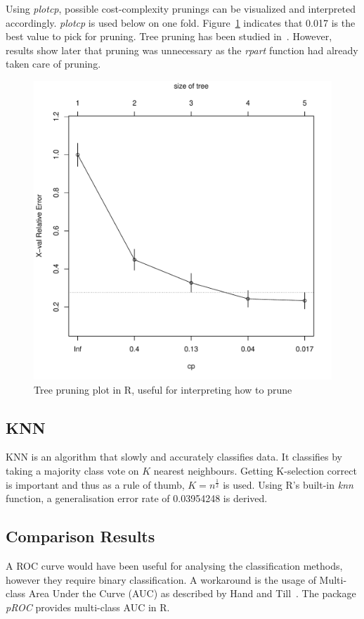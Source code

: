 \documentclass[11pt]{article}
\begin{document}
\pagebreak Using \textit{plotcp}, possible cost-complexity prunings can be visualized and interpreted accordingly. \textit{plotcp} is used below on one fold. Figure~\ref{fig:t2_tree_prune} indicates that 0.017 is the best value to pick for pruning. Tree pruning has been studied in~\cite{cestnik1991estimating}. However, results show later that pruning was unnecessary as the \textit{rpart} function had already taken care of pruning.
\begin{figure}[H]
    \centering
    \includegraphics[width=1.0\textwidth]{t2_tree_prune}
    \caption{Tree pruning plot in R, useful for interpreting how to prune}
    \label{fig:t2_tree_prune}
\end{figure}

\pagebreak\subsection{KNN}
KNN is an algorithm that slowly and accurately classifies data. It classifies by taking a majority class vote on $K$ nearest neighbours. Getting K-selection correct is important and thus as a rule of thumb, $K=n^\frac{1}{2}$ is used. Using R's built-in \textit{knn} function, a generalisation error rate of 0.03954248 is derived. 

\subsection{Comparison Results}
A ROC curve would have been useful for analysing the classification methods, however they require binary classification. A workaround is the usage of Multi-class Area Under the Curve (AUC) as described by Hand and Till~\cite{hand2001simple}. The package \textit{pROC} provides multi-class AUC in R. 
\end{document}
